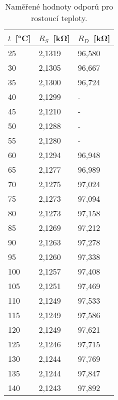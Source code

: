 \begin{table}[h!]
    \caption{Naměřené hodnoty odporů pro rostoucí teploty.}
    \centering
    \def\arraystretch{1.4}
    \begin{tabular}{l|l|l}
        \(t\)\ [\unit{\degreeCelsius}]  &   \(R_{S} \)\ [\unit{\kilo\ohm}]       &   \(R_{D} \)\ [\unit{\kilo\ohm}] \\
        \hline \hline
        25  &   2,1319  &   96,580   \\ \hline
        30  &   2,1305  &   96,667   \\ \hline
        35  &   2,1300  &   96,724   \\ \hline
        40  &   2,1299  &   -    \\ \hline
        45  &   2,1210  &   -    \\ \hline
        50  &   2,1288  &   -    \\ \hline
        55  &   2,1280  &   -    \\ \hline
        60  &   2,1294  &   96,948   \\ \hline
        65  &   2,1277  &   96,989   \\ \hline
        70  &   2,1275  &   97,024   \\ \hline
        75  &   2,1273  &   97,094   \\ \hline
        80  &   2,1273  &   97,158   \\ \hline
        85  &   2,1269  &   97,212   \\ \hline
        90  &   2,1263  &   97,278   \\ \hline
        95  &   2,1260  &   97,338   \\ \hline
        100 &   2,1257  &   97,408   \\ \hline
        105 &   2,1251  &   97,469   \\ \hline
        110 &   2,1249  &   97,533   \\ \hline
        115 &   2,1249  &   97,586   \\ \hline
        120 &   2,1249  &   97,621   \\ \hline
        125 &   2,1246  &   97,715   \\ \hline
        130 &   2,1244  &   97,769   \\ \hline
        135 &   2,1244  &   97,847   \\ \hline
        140 &   2,1243  &   97,892   \\ 
    \end{tabular}
    \label{tab:tkr_hodnoty}
\end{table}

